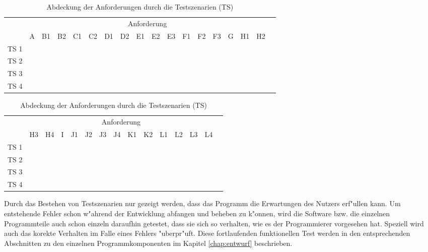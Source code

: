\begin{table}[tbh]
\caption[Abdeckung der Anforderungen durch die Testszenarien]{Abdeckung der Anforderungen durch die Testszenarien (TS)}
\centering
\begin{tabular}{|r|c|c|c|c|c|c|c|c|c|c|c|c|c|c|c|c|c|}
	\cline{2-17}
	\multicolumn{1}{r|}{} & \multicolumn{16}{|c|}{Anforderung} \\ \cline{2-17}
	\multicolumn{1}{r|}{} & A & B1 & B2 & C1 & C2 & D1 & D2 & E1 & E2 & E3 & F1 & F2 & F3 & G & H1 & H2\\ \hline
	TS 1 & \Checkmark & \Checkmark &  & \Checkmark & \Checkmark & \Checkmark & \Checkmark & \Checkmark & \Checkmark & \Checkmark & \Checkmark & \Checkmark & \Checkmark & & \Checkmark & \Checkmark \\ \hline
	TS 2 & \Checkmark & \Checkmark & & \Checkmark & \Checkmark & & & \Checkmark & & & \Checkmark & \Checkmark & \Checkmark & & & \Checkmark \\ \hline
	TS 3 &&&&&&&&&&&&&&&& \\ \hline
	TS 4 &&&&&&&&&&&&&&&& \\ \hline
\end{tabular}

\vspace{2ex}

\begin{tabular}{|r|c|c|c|c|c|c|c|c|c|c|c|c|c|c|}
	\cline{2-14}
	\multicolumn{1}{r|}{} & \multicolumn{13}{|c|}{Anforderung} \\ \cline{2-14}
	\multicolumn{1}{r|}{} & H3 & H4 & I & J1 & J2 & J3 & J4 & K1 & K2 & L1 & L2 & L3 & L4 \\ \hline
	TS 1 & & & & & \Checkmark & & & & & & & & \\ \hline
	TS 2 & \Checkmark & \Checkmark & \Checkmark & & \Checkmark & & & \Checkmark & \Checkmark & & & & \\ \hline
	TS 3 &&&&&&&&&&&&& \\ \hline
	TS 4 &&&&&&&&&&&&& \\ \hline
\end{tabular}
\end{table}

Durch das Bestehen von Testszenarien nur gezeigt werden, dass das Programm die Erwartungen des Nutzers erf"ullen kann.
Um entstehende Fehler schon w"ahrend der Entwicklung abfangen und beheben zu k"onnen, wird die Software bzw. die einzelnen Programmteile auch schon einzeln daraufhin getestet, dass sie sich so verhalten, wie es der Programmierer vorgesehen hat.
Speziell wird auch das korekte Verhalten im Falle eines Fehlers "uberpr"uft.
Diese fortlaufenden funktionellen Test werden in den entsprechenden Abschnitten zu den einzelnen Programmkomponenten im Kapitel \ref{chap:entwurf} beschrieben.

